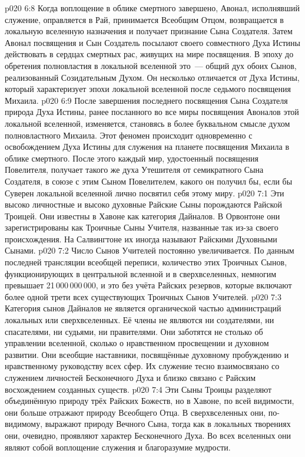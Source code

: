 \vs p020 6:8 Когда воплощение в облике смертного завершено, Авонал, исполнявший служение, оправляется в Рай, принимается Всеобщим Отцом, возвращается в локальную вселенную назначения и получает признание Сына Создателя. Затем Авонал посвящения и Сын Создатель посылают своего совместного Духа Истины действовать в сердцах смертных рас, живущих на мире посвящения. В эпоху до обретения полновластия в локальной вселенной это~--- общий дух обоих Сынов, реализованный Созидательным Духом. Он несколько отличается от Духа Истины, который характеризует эпохи локальной вселенной после седьмого посвящения Михаила.
\vs p020 6:9 После завершения последнего посвящения Сына Создателя природа Духа Истины, ранее посланного во все миры посвящения Авоналов этой локальной вселенной, изменяется, становясь в более буквальном смысле духом полновластного Михаила. Этот феномен происходит одновременно с освобождением Духа Истины для служения на планете посвящения Михаила в облике смертного. После этого каждый мир, удостоенный посвящения Повелителя, получает такого же духа Утешителя от семикратного Сына Создателя, в союзе с этим Сыном Повелителем, какого он получил бы, если бы Суверен локальной вселенной лично посвятил себя этому миру.
\vs p020 7:1 Эти высоко личностные и высоко духовные Райские Сыны порождаются Райской Троицей. Они известны в Хавоне как категория Дайналов. В Орвонтоне они зарегистрированы как Троичные Сыны Учителя, названные так из\hyp{}за своего происхождения. На Салвингтоне их иногда называют Райскими Духовными Сынами.
\vs p020 7:2 Число Сынов Учителей постоянно увеличивается. По данным последней трансляции всеобщей переписи, количество этих Троичных Сынов, функционирующих в центральной всленной и в сверхвселенных, немногим превышает 21\,000\,000\,000, и это без учёта Райских резервов, которые включают более одной трети всех существующих Троичных Сынов Учителей.
\vs p020 7:3 Категория сынов Дайналов не является органической частью администраций локальных или сверхвселенных. Её члены не являются ни создателями, ни спасателями, ни судьями, ни правителями. Они заботятся не столько об управлении вселенной, сколько о нравственном просвещении и духовном развитии. Они всеобщие наставники, посвящённые духовному пробуждению и нравственному руководству всех сфер. Их служение тесно взаимосвязано со служением личностей Бесконечного Духа и близко связано с Райским восхождением созданных существ.
\vs p020 7:4 Эти Сыны Троицы разделяют объединённую природу трёх Райских Божеств, но в Хавоне, по всей видимости, они больше отражают природу Всеобщего Отца. В сверхвселенных они, по\hyp{}видимому, выражают природу Вечного Сына, тогда как в локальных творениях они, очевидно, проявляют характер Бесконечного Духа. Во всех вселенных они являют собой воплощение служения и благоразумие мудрости.
